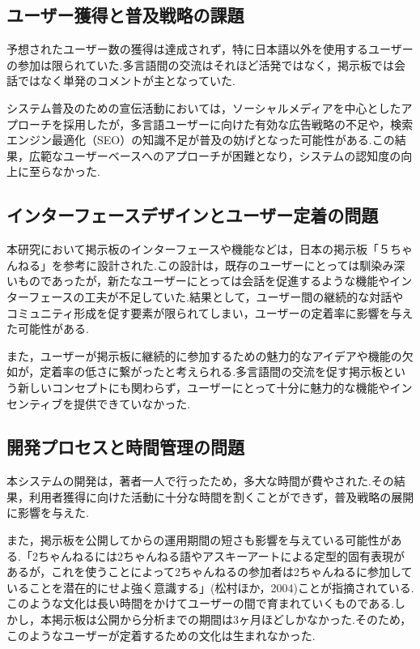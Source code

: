 \documentclass[b5paper,12pt,dvipdfmx]{jsreport}
\begin{document}
\subsection{ユーザー獲得と普及戦略の課題}

予想されたユーザー数の獲得は達成されず，特に日本語以外を使用するユーザーの参加は限られていた.多言語間の交流はそれほど活発ではなく，掲示板では会話ではなく単発のコメントが主となっていた.

システム普及のための宣伝活動においては，ソーシャルメディアを中心としたアプローチを採用したが，多言語ユーザーに向けた有効な広告戦略の不足や，検索エンジン最適化（SEO）の知識不足が普及の妨げとなった可能性がある.この結果，広範なユーザーベースへのアプローチが困難となり，システムの認知度の向上に至らなかった.

\subsection{インターフェースデザインとユーザー定着の問題}

本研究において掲示板のインターフェースや機能などは，日本の掲示板「５ちゃんねる」を参考に設計された.この設計は，既存のユーザーにとっては馴染み深いものであったが，新たなユーザーにとっては会話を促進するような機能やインターフェースの工夫が不足していた.結果として，ユーザー間の継続的な対話やコミュニティ形成を促す要素が限られてしまい，ユーザーの定着率に影響を与えた可能性がある.

また，ユーザーが掲示板に継続的に参加するための魅力的なアイデアや機能の欠如が，定着率の低さに繋がったと考えられる.多言語間の交流を促す掲示板という新しいコンセプトにも関わらず，ユーザーにとって十分に魅力的な機能やインセンティブを提供できていなかった.

\subsection{開発プロセスと時間管理の問題}

本システムの開発は，著者一人で行ったため，多大な時間が費やされた.その結果，利用者獲得に向けた活動に十分な時間を割くことができず，普及戦略の展開に影響を与えた.

また，掲示板を公開してからの運用期間の短さも影響を与えている可能性がある.「2ちゃんねるには2ちゃんねる語やアスキーアートによる定型的固有表現があるが，これを使うことによって2ちゃんねるの参加者は2ちゃんねるに参加していることを潜在的にせよ強く意識する」(松村ほか，2004)ことが指摘されている.このような文化は長い時間をかけてユーザーの間で育まれていくものである.しかし，本掲示板は公開から分析までの期間は3ヶ月ほどしかなかった.そのため，このようなユーザーが定着するための文化は生まれなかった.
\end{document}
